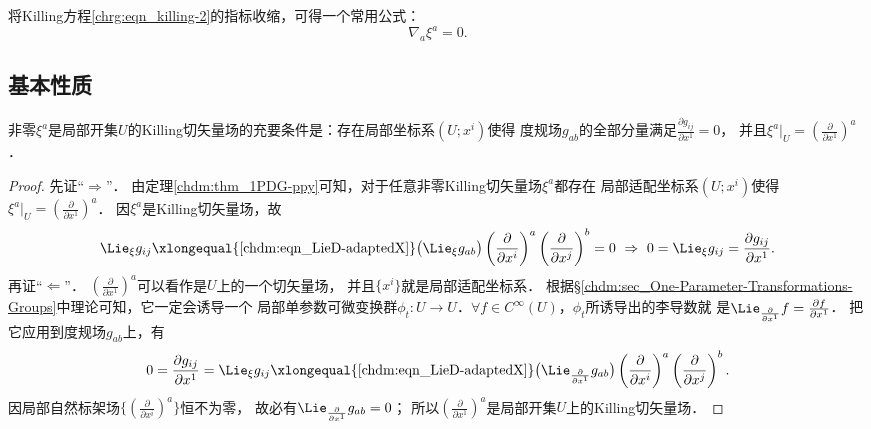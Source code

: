 将Killing方程\eqref{chrg:eqn_killing-2}的指标收缩，可得一个常用公式：
\begin{equation}\label{chrg:eqn_nk=0}
    {\nabla_a} \xi^a = 0 .
\end{equation}

\subsection{基本性质}
\begin{theorem}\label{chrg:thm_killing-partial-x1}
    非零$\xi^a$是局部开集$U$的Killing切矢量场的充要条件是：存在局部坐标系$(U;x^i)$使得
    度规场$g_{ab}$的全部分量满足$\frac{\partial g_{ij}}{\partial x^1}=0$，
    并且$\xi^a |_U = (\frac{\partial }{\partial x^1} )^a$．
\end{theorem}
\begin{proof}
    先证“$\Rightarrow$”．
    由定理\ref{chdm:thm_1PDG-ppy}可知，对于任意非零Killing切矢量场$\xi^a$都存在
    局部{\kaishu 适配坐标系}$(U;x^i)$使得$\xi^a |_U = (\frac{\partial }{\partial x^1} )^a$．
    因$\xi^a$是Killing切矢量场，故 %
    \begin{equation}
        \Lie_{\xi} g_{ij}  \xlongequal{\ref{chdm:eqn_LieD-adaptedX}}
        \bigl(\Lie_{\xi} g_{ab}\bigr)
        \left(\frac{\partial }{\partial x^i} \right)^a \left(\frac{\partial }{\partial x^j} \right)^b=0
         \ \Rightarrow \ 
        0=\Lie_{\xi} g_{ij}= \frac{\partial g_{ij}}{\partial x^1}.
    \end{equation}
    再证“$\Leftarrow$”．
    $\left(\frac{\partial }{\partial x^1}\right)^a$可以看作是$U$上的一个切矢量场，
    并且$\{x^i\}$就是局部{\kaishu 适配坐标系}．
    根据\S\ref{chdm:sec_One-Parameter-Transformations-Groups}中理论可知，它一定会诱导一个
    局部单参数可微变换群$\phi_t:U\to U$．$\forall f\in C^\infty(U)$，$\phi_t$所诱导出的李导数就
    是$\Lie_{\frac{\partial }{\partial x^1}} f= \frac{\partial f}{\partial x^1}$．
    把它应用到度规场$g_{ab}$上，有
    \begin{equation}
        0= \frac{\partial g_{ij}}{\partial x^1} = \Lie_{\xi} g_{ij}
        \xlongequal{\ref{chdm:eqn_LieD-adaptedX}}
        \bigl(\Lie_{\frac{\partial }{\partial x^1}} g_{ab}\bigr)
        \left(\frac{\partial }{\partial x^i} \right)^a
        \left(\frac{\partial }{\partial x^j} \right)^b .
    \end{equation}
    因局部自然标架场$\{\left(\frac{\partial }{\partial x^i} \right)^a\}$恒不为零，
    故必有$\Lie_{\frac{\partial }{\partial x^1}} g_{ab}=0$；
    所以$\left(\frac{\partial }{\partial x^1}\right)^a$是局部开集$U$上的Killing切矢量场．
\end{proof}


